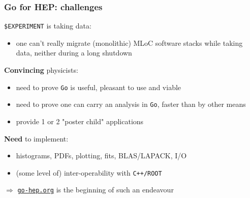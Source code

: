 \documentclass[9pt]{beamer}
\newcommand{\myblue} [1] {{\color{blue}#1}}
\begin{document}
\begin{frame}[fragile]
\frametitle{Go for HEP: challenges}


\texttt{\$EXPERIMENT} is taking data:


\begin{itemize}
\item one can't really migrate (monolithic) MLoC software stacks while taking data, neither during a long shutdown
\end{itemize}

	\begin{block}{\textbf{Convincing} physicists:}


\begin{itemize}
\item need to prove \texttt{Go} is useful, pleasant to use and viable
\item need to prove one can carry an analysis in \texttt{Go}, faster than by other means
\item provide 1 or 2 "poster child" applications
\end{itemize}
	\end{block}{}

\textbf{Need} to implement:


\begin{itemize}
\item histograms, PDFs, plotting, fits, BLAS/LAPACK, I/O
\item (some level of) inter-operability with \texttt{C++/ROOT}
\end{itemize}

	\begin{block}{}
		\begin{center}
$\Rightarrow$ \myblue{\href{https://go-hep.org}{\texttt{go-hep.org}}} is the beginning of such an endeavour
		\end{center}
	\end{block}{}


\end{frame}
\end{document}
